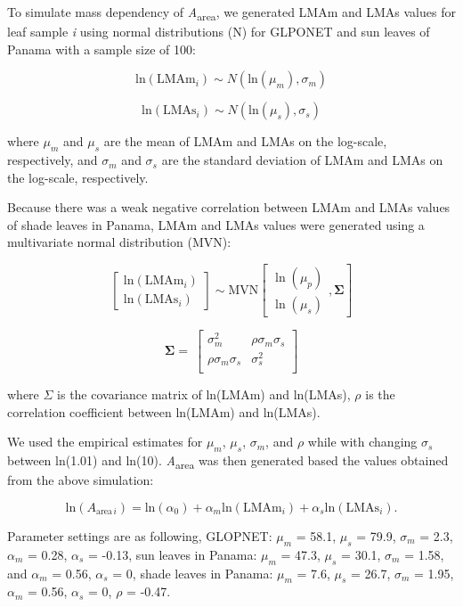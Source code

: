 \documentclass[
  12pt,
  letterpaper,
  DIV=11,
  numbers=noendperiod]{scrartcl}
\begin{document}
To simulate mass dependency of \emph{A}\textsubscript{area}, we
generated LMAm and LMAs values for leaf sample \emph{i} using normal
distributions (N) for GLPONET and sun leaves of Panama with a sample
size of 100:

\[
\mathrm{ln}(\mathrm{LMAm}_{i}) \sim N(\mathrm{ln}(\mu_m), \sigma_m)
\]

\[
\mathrm{ln}(\mathrm{LMAs}_{i}) \sim N(\mathrm{ln}(\mu_s), \sigma_s)
\]

where \(\mu_m\) and \(\mu_s\) are the mean of LMAm and LMAs on the
log-scale, respectively, and \(\sigma_m\) and \(\sigma_s\) are the
standard deviation of LMAm and LMAs on the log-scale, respectively.

Because there was a weak negative correlation between LMAm and LMAs
values of shade leaves in Panama, LMAm and LMAs values were generated
using a multivariate normal distribution (MVN):

\[
\begin{bmatrix}
\mathrm{ln}(\mathrm{LMAm}_{i})\\
\mathrm{ln}(\mathrm{LMAs}_{i})
\end{bmatrix}
\sim \mathrm{MVN}
\left[
\begin{matrix}
\ln(\mu_{p})\\
\ln(\mu_{s})
\end{matrix}
,\mathbf{\Sigma}
\right]
\]

\[
\mathbf{\Sigma} = \
\begin{bmatrix}
\sigma_m^2 & \rho \sigma_m \sigma_s \\
\rho \sigma_m \sigma_s & \sigma_s^2 \\
\end{bmatrix}
\]

where \(\Sigma\) is the covariance matrix of ln(LMAm) and ln(LMAs),
\(\rho\) is the correlation coefficient between ln(LMAm) and ln(LMAs).

We used the empirical estimates for \(\mu_m\), \(\mu_s\), \(\sigma_m\),
and \(\rho\) while with changing \(\sigma_s\) between ln(1.01) and
ln(10). \emph{A}\textsubscript{area} was then generated based the values
obtained from the above simulation:

\[
\mathrm{ln}(A_{\mathrm{area} \, i}) = \mathrm{ln}(\alpha_0) + \alpha_m\mathrm{ln}(\mathrm{LMAm}_{i}) + \alpha_s\mathrm{ln}(\mathrm{LMAs}_{i}).
\]

Parameter settings are as following, GLOPNET: \(\mu_m\) = 58.1,
\(\mu_s\) = 79.9, \(\sigma_m\) = 2.3, \(\alpha_m\) = 0.28, \(\alpha_s\)
= -0.13, sun leaves in Panama: \(\mu_m\) = 47.3, \(\mu_s\) = 30.1,
\(\sigma_m\) = 1.58, and \(\alpha_m\) = 0.56, \(\alpha_s\) = 0, shade
leaves in Panama: \(\mu_m\) = 7.6, \(\mu_s\) = 26.7, \(\sigma_m\) =
1.95, \(\alpha_m\) = 0.56, \(\alpha_s\) = 0, \(\rho\) = -0.47.
\end{document}
